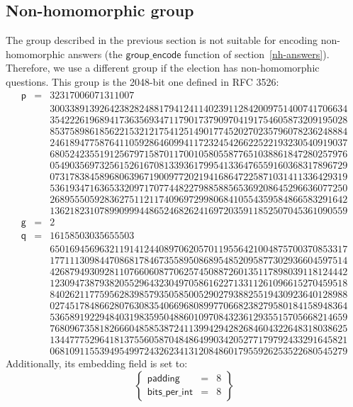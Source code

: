 \documentclass[a4paper]{article}
\begin{document}
\subsection{Non-homomorphic group}
\label{nh-group}

The group described in the previous section is not suitable for
encoding non-homomorphic answers (the $\textsf{group\_encode}$
function of section~\ref{nh-answers}). Therefore, we use a different
group if the election has non-homomorphic questions. This group is
the 2048-bit one defined in RFC 3526:
\[
\begin{array}{lcr}
\textsf{p}&=&32317006071311007\\
&&300338913926423828248817941241140239112842009751400741706634\\
&&354222619689417363569347117901737909704191754605873209195028\\
&&853758986185622153212175412514901774520270235796078236248884\\
&&246189477587641105928646099411723245426622522193230540919037\\
&&680524235519125679715870117001058055877651038861847280257976\\
&&054903569732561526167081339361799541336476559160368317896729\\
&&073178384589680639671900977202194168647225871031411336429319\\
&&536193471636533209717077448227988588565369208645296636077250\\
&&268955505928362751121174096972998068410554359584866583291642\\
&&136218231078990999448652468262416972035911852507045361090559\\
\textsf{g}&=&2\\
\textsf{q}&=&16158503035655503\\
&&650169456963211914124408970620570119556421004875700370853317\\
&&177111309844708681784673558950868954852095877302936604597514\\
&&426879493092811076606087706257450887260135117898039118124442\\
&&123094738793820552964323049705861622713311261096615270459518\\
&&840262117759562839857935058500529027938825519430923640128988\\
&&027451784866280763083540669680899770668238279580184158948364\\
&&536589192294840319835950488601097084323612935515705668214659\\
&&768096735818266604858538724113994294282684604322648318038625\\
&&134477752964181375560587048486499034205277179792433291645821\\
&&068109115539495499724326234131208486017955926253522680545279
\end{array}
\]
Additionally, its \textsf{embedding} field is set to:
\[
  \left\{
    \begin{array}{rcl}
      \textsf{padding}&=&8\\
      \textsf{bits\_per\_int}&=&8
    \end{array}
  \right\}
\]
\end{document}
